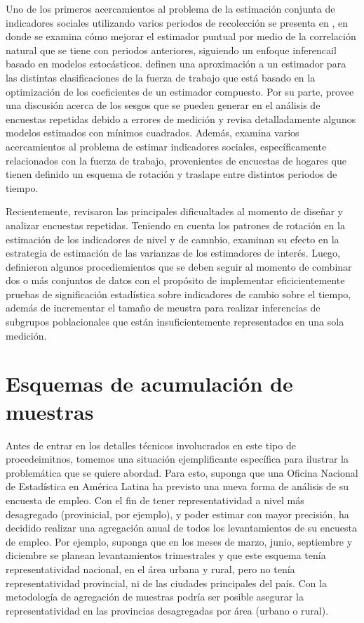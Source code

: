 \documentclass[12pt,spanish,]{book}
\begin{document}
Uno de los primeros acercamientos al problema de la estimación conjunta de indicadores sociales utilizando varios periodos de recolección se presenta en \textcite{Gurney_Daly_1965}, en donde se examina cómo mejorar el estimador puntual por medio de la correlación natural que se tiene con periodos anteriores, siguiendo un enfoque inferencail basado en modelos estocásticos. \textcite{Lent_Miller_Duff_1999} definen una aproximación a un estimador para las distintas clasificaciones de la fuerza de trabajo que está basado en la optimización de los coeficientes de un estimador compuesto. Por su parte, \textcite{Fuller_1990} provee una discusión acerca de los sesgos que se pueden generar en el análisis de encuestas repetidas debido a errores de medición y revisa detalladamente algunos modelos estimados con mínimos cuadrados. Además, \textcite{Bell_2001} examina varios acercamientos al problema de estimar indicadores sociales, específicamente relacionados con la fuerza de trabajo, provenientes de encuestas de hogares que tienen definido un esquema de rotación y traslape entre distintos periodos de tiempo.

Recientemente, \textcite{Steel_McLaren_2008} revisaron las principales dificualtades al momento de diseñar y analizar encuestas repetidas. Teniendo en cuenta los patrones de rotación en la estimación de los indicadores de nivel y de camnbio, examinan su efecto en la estrategia de estimación de las varianzas de los estimadores de interés. Luego, \textcite{Lewis_2017} definieron algunos procediemientos que se deben seguir al momento de combinar dos o más conjuntos de datos con el propósito de implementar eficicientemente pruebas de significación estadística sobre indicadores de cambio sobre el tiempo, además de incrementar el tamaño de meustra para realizar inferencias de subgrupos poblacionales que están insuficientemente representados en una sola medición.

\hypertarget{esquemas-de-acumulacion-de-muestras}{%
\section{Esquemas de acumulación de muestras}\label{esquemas-de-acumulacion-de-muestras}}

Antes de entrar en los detalles técnicos involucrados en este tipo de procedeimitnos, tomemos una situación ejemplificante específica para ilustrar la problemática que se quiere abordad. Para esto, suponga que una Oficina Nacional de Estadística en América Latina ha previsto una nueva forma de análisis de su encuesta de empleo. Con el fin de tener representatividad a nivel más desagregado (provinicial, por ejemplo), y poder estimar con mayor precisión, ha decidido realizar una agregación anual de todos los levantamientos de su encuesta de empleo. Por ejemplo, suponga que en los meses de marzo, junio, septiembre y diciembre se planean levantamientos trimestrales y que este esquema tenía representatividad nacional, en el área urbana y rural, pero no tenía representatividad provincial, ni de las ciudades principales del país. Con la metodología de agregación de muestras podría ser posible asegurar la representatividad en las provincias desagregadas por área (urbano o rural).
\end{document}

